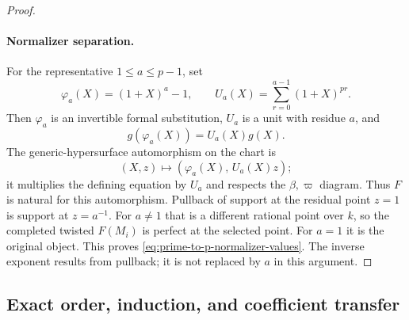 \begin{proof}
\paragraph{Normalizer separation.}
For the representative \(1\le a\le p-1\), set
\[
 \varphi_a(X)=(1+X)^a-1,\qquad
 U_a(X)=\sum_{r=0}^{a-1}(1+X)^{pr}.
\]
Then \(\varphi_a\) is an invertible formal substitution,
\(U_a\) is a unit with residue \(a\), and
\[
 g(\varphi_a(X))=U_a(X)g(X).
\]
The generic-hypersurface automorphism on the chart is
\[
 (X,z)\longmapsto(\varphi_a(X),\,U_a(X)z);
\]
it multiplies the defining equation by \(U_a\) and respects the
\(\beta,\varpi\) diagram.  Thus \(F\) is natural for this automorphism.
Pullback of support at the residual point \(z=1\) is support at
\(z=a^{-1}\).  For \(a\ne1\) that is a different rational point
over \(k\), so the completed twisted \(F(M_i)\) is perfect at the
selected point.  For \(a=1\) it is the original object.
This proves \eqref{eq:prime-to-p-normalizer-values}.
The inverse exponent results from pullback; it is not replaced
by \(a\) in this argument.
\end{proof}

\subsection{Exact order, induction, and coefficient transfer}

